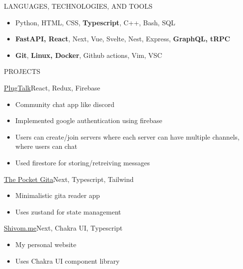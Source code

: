 \documentclass[]{mcdowellcv}
\begin{document}
\begin{cvsection}{LANGUAGES, TECHNOLOGIES, AND TOOLS}
		\begin{cvsubsection}{}{}{}	
			\begin{itemize}
				\item Python, HTML, CSS, {\bf Typescript}, C++, Bash, SQL
				\item {\bf FastAPI, React}, Next, Vue, Svelte, Nest, Express, {\bf GraphQL, tRPC}
				\item {\bf Git}, {\bf Linux, Docker}, Github actions, Vim, VSC
			\end{itemize}
		\end{cvsubsection}
	\end{cvsection}
	
	\begin{cvsection}{PROJECTS}
		\begin{cvsubsection}{\href{https://github.com/Guchii/PlugTalk}{PlugTalk}}{}{React, Redux, Firebase}	
			\begin{itemize}
                    \item Community chat app like discord
            	\item Implemented google authentication using firebase
                    \item Users can create/join servers where each server can have multiple channels, where users can chat
                    \item Used firestore for storing/retreiving messages
			\end{itemize}
		\end{cvsubsection}
		\begin{cvsubsection}{\href{https://github.com/guchii/the-pocket-gita}{The Pocket Gita}}{}{Next, Typescript, Tailwind}
                \begin{itemize}
                    \item Minimalistic gita reader app
                    \item Uses zustand for state management
                \end{itemize}
		\end{cvsubsection}
            \begin{cvsubsection}{\href{https://shivom.me}{Shivom.me}}{}{Next, Chakra UI, Typescript}
                \begin{itemize}
                    \item My personal website
                    \item Uses Chakra UI component library

\end{itemize}
\end{cvsubsection}
\end{cvsection}
\end{document}

